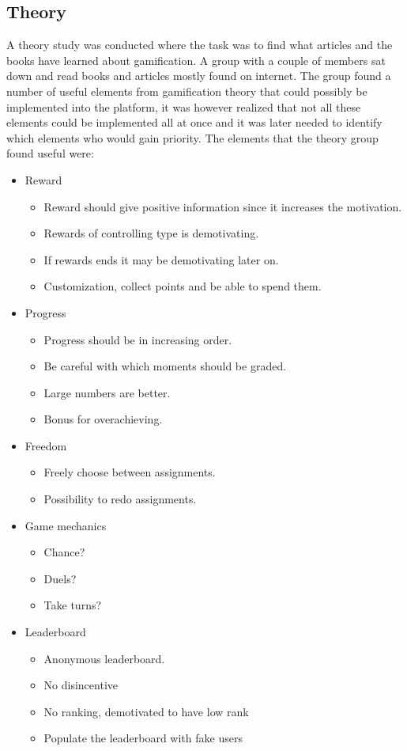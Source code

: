 \documentclass[a4paper,12pt]{article}
\begin{document}
\subsection{Theory} 
A theory study was conducted where the task was to find what articles and the books have learned about gamification. A group with a couple of members sat down and read books and articles mostly found on internet. The group found a number of useful elements from gamification theory that could possibly be implemented into the platform, it was however realized that not all these elements could be implemented all at once and it was later needed to identify which elements who would gain priority. The elements that the theory group found useful were:
\begin{itemize}
\item Reward
\begin{itemize}
 \item Reward should give positive information since it increases the motivation.
 \item Rewards of controlling type is demotivating.
 \item If rewards ends it may be demotivating later on.
 \item Customization, collect points and be able to spend them.
 \end{itemize}
\item Progress
\begin{itemize}
    \item Progress should be in increasing order.
    \item Be careful with which moments should be graded.
    \item Large numbers are better.
    \item Bonus for overachieving. 
\end{itemize}
\item Freedom
\begin{itemize}
    \item Freely choose between assignments.
    \item Possibility to redo assignments.
\end{itemize}
\item Game mechanics
\begin{itemize}
    \item Chance?
    \item Duels?
    \item Take turns?
\end{itemize}
\item Leaderboard
\begin{itemize}
    \item Anonymous leaderboard.
    \item No disincentive
    \item No ranking, demotivated to have low rank
    \item Populate the leaderboard with fake users
\end{itemize}
\end{itemize}
\end{document}
